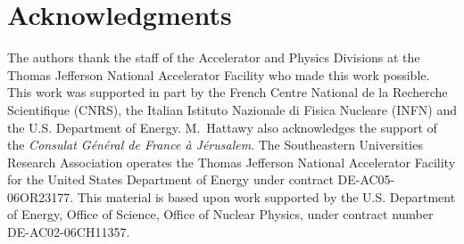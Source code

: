 \section{Acknowledgments}

The authors thank the staff of the Accelerator and Physics Divisions at the 
Thomas Jefferson National Accelerator Facility who made this work possible.  
This work was supported in part by the French Centre National de la Recherche 
Scientifique (CNRS), the Italian Istituto Nazionale di Fisica Nucleare (INFN) 
and the U.S. Department of Energy. M.~Hattawy also acknowledges the support of 
the {\it Consulat G\'en\'eral de France \`a J\'erusalem}.  The Southeastern 
Universities Research Association operates the Thomas Jefferson National 
Accelerator Facility for the United States Department of Energy under contract 
DE-AC05-06OR23177. This material is based upon work supported by the U.S.  
Department of Energy, Office of Science, Office of Nuclear Physics, under 
contract number DE-AC02-06CH11357.
